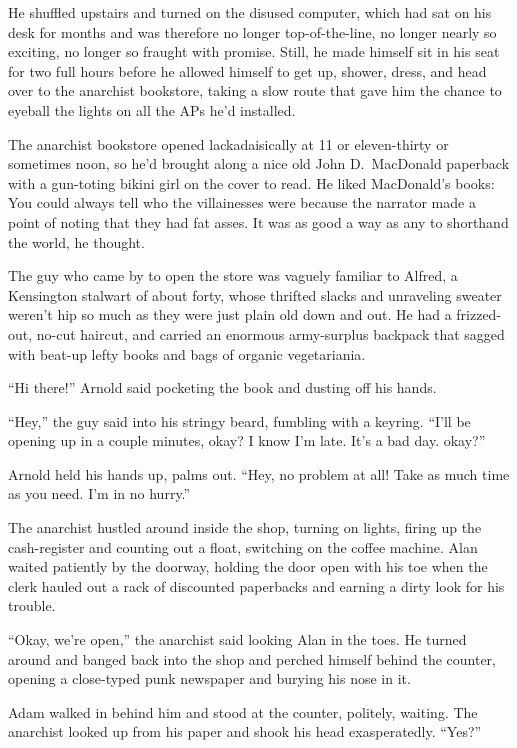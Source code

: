 \documentclass{article}
\begin{document}
He shuffled upstairs and turned on the disused computer, which had sat
on his desk for months and was therefore no longer top-of-the-line, no
longer nearly so exciting, no longer so fraught with promise.  Still,
he made himself sit in his seat for two full hours before he allowed
himself to get up, shower, dress, and head over to the anarchist
bookstore, taking a slow route that gave him the chance to eyeball the
lights on all the APs he'd installed.

The anarchist bookstore opened lackadaisically at 11 or eleven-thirty
or sometimes noon, so he'd brought along a nice old John D.\ MacDonald
paperback with a gun-toting bikini girl on the cover to read.  He
liked MacDonald's books:  You could always tell who the villainesses
were because the narrator made a point of noting that they had fat
asses.  It was as good a way as any to shorthand the world, he
thought.

The guy who came by to open the store was vaguely familiar to Alfred,
a Kensington stalwart of about forty, whose thrifted slacks and
unraveling sweater weren't hip so much as they were just plain old
down and out.  He had a frizzed-out, no-cut haircut, and carried an
enormous army-surplus backpack that sagged with beat-up lefty books
and bags of organic vegetariania.

``Hi there!'' Arnold said pocketing the book and dusting off his
hands.

``Hey,'' the guy said into his stringy beard, fumbling with a keyring. 
``I'll be opening up in a couple minutes, okay?  I know I'm late. 
It's a bad day.  okay?''

Arnold held his hands up, palms out.  ``Hey, no problem at all!  Take
as much time as you need.  I'm in no hurry.''

The anarchist hustled around inside the shop, turning on lights,
firing up the cash-register and counting out a float, switching on the
coffee machine.  Alan waited patiently by the doorway, holding the
door open with his toe when the clerk hauled out a rack of discounted
paperbacks and earning a dirty look for his trouble.

``Okay, we're open,'' the anarchist said looking Alan in the toes.  He
turned around and banged back into the shop and perched himself behind
the counter, opening a close-typed punk newspaper and burying his nose
in it.

Adam walked in behind him and stood at the counter, politely, waiting. 
The anarchist looked up from his paper and shook his head
exasperatedly.  ``Yes?''
\end{document}
